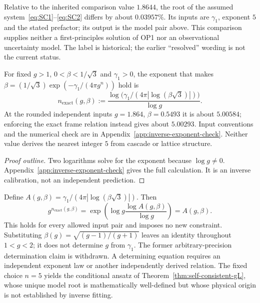 \begin{corollary}
\label{cor:op1-resolved}
Relative to the inherited comparison value $1.8644$, the root of
the assumed system~\eqref{eq:SC1}--\eqref{eq:SC2} differs by
about $0.03957\%$. Its inputs are $\gamma_1$, exponent $5$ and
the stated prefactor; its output is the model pair above. This
comparison supplies neither a first-principles solution of OP1 nor
an observational uncertainty model. The label is historical;
the earlier ``resolved'' wording is not the current status.
\end{corollary}

\begin{proposition}
\label{prop:exponent-5}
For fixed $g>1$, $0<\beta<1/\sqrt3$ and $\gamma_1>0$, the exponent
that makes $\beta=(1/\sqrt3)\exp(-\gamma_1/(4\pi g^n))$ hold is
\[
 n_{\mathrm{exact}}(g,\beta)
 :=\frac{\log\!\bigl(\gamma_1/(4\pi|\log(\beta\sqrt3)|)\bigr)}
         {\log g}.
\]
At the rounded independent inputs $g=1.864$, $\beta=0.5493$ it is
about $5.00584$; enforcing the exact frame relation instead gives
about $5.00293$. Input conventions and the numerical check are in
Appendix~\ref{app:inverse-exponent-check}. Neither value derives
the nearest integer $5$ from cascade or lattice structure.
\end{proposition}

\begin{proof}[Proof outline]
Two logarithms solve for the exponent because $\log g\ne0$.
Appendix~\ref{app:inverse-exponent-check} gives the full calculation.
It is an inverse calibration, not an independent prediction.
\end{proof}

\begin{remark}
\label{rem:exact-sc}
Define $A(g,\beta)=\gamma_1/(4\pi|\log(\beta\sqrt3)|)$. Then
\[
 g^{n_{\mathrm{exact}}(g,\beta)}
 =\exp\!\left(\log g\frac{\log A(g,\beta)}{\log g}\right)
 =A(g,\beta).
\]
This holds for every allowed input pair and imposes no new constraint.
Substituting $\beta(g)=\sqrt{(g-1)/(g+1)}$ leaves an identity throughout
$1<g<2$; it does not determine $g$ from $\gamma_1$.
The former arbitrary-precision determination claim is withdrawn.
A determining equation requires an independent exponent law or another
independently derived relation. The fixed choice $n=5$ yields the
conditional ansatz of Theorem~\ref{thm:self-consistent-gL}, whose
unique model root is mathematically well-defined but whose physical
origin is not established by inverse fitting.
\end{remark}

